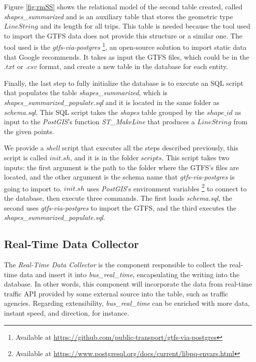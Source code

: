 Figure \ref{fig:rmSS} shows the relational model of the second table created, called {\em  shapes\_summarized} and is an auxiliary table 
that stores the geometric type $LineString$ and its length for all trips. 
This table is needed because the tool used to import the GTFS data does not
provide this structure or a similar one. The tool used is the \textit{gtfs-via-postgres} 
\footnote{Available at \url{https://github.com/public-transport/gtfs-via-postgres}},
an open-source solution to import static data that Google recommends. It takes as input the
GTFS files, which could be in the $.txt$ or $.csv$ format, and create a new table in the database for each
entity. 

Finally, the last step to fully initialize the database is to execute an SQL script that populates
the table {\em  shapes\_summarized}, which is \textit{shapes\_summarized\_populate.sql}
and it is located in the same folder as \textit{schema.sql}.
This SQL script takes the \textit{shapes} table grouped by the $shape\_id$
as input to the \textit{PostGIS}'s function { \em ST\_MakeLine} that produces a $LineString$ from the given points.

We provide a{ \em shell} script that executes all the steps described previously, this script is 
called $init.sh$, and it is in the folder $scripts$. This script takes two inputs: 
the first argument is the path to the folder where the GTFS's files are located, and 
the other argument is the schema name that \textit{gtfs-via-postgres} is going to import to.
$init.sh$ uses \textit{PostGIS}'s environment variables
\footnote{Available at \url{https://www.postgresql.org/docs/current/libpq-envars.html}}
to connect to the database, then execute three commands. The first loads \textit{schema.sql},
the second uses \textit{gtfs-via-postgres} to import the GTFS, and the third executes the 
\textit{shapes\_summarized\_populate.sql}.


\subsection{Real-Time Data Collector}
The \textit{Real-Time Data Collector} is the component responsible to 
collect the real-time data and insert it into {\em  bus\_real\_time},
encapsulating the writing into the database. In other words, this component will incorporate the data 
from real-time traffic \ac{API} provided by some external source into the table, such as traffic agencies.
Regarding extensibility, {\em bus\_real\_time} can be enriched with more data, 
instant speed, and direction, for instance.

